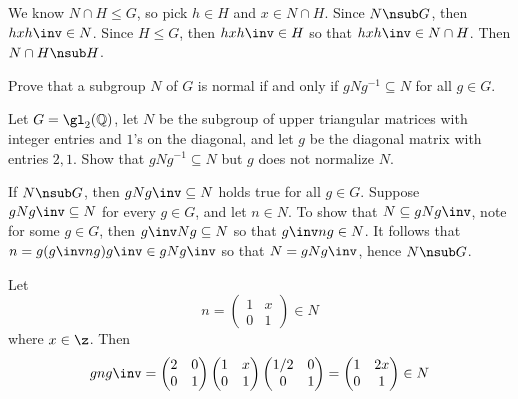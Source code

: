 \begin{problems}
    \begin{sol}
        We know $N \cap H \leq G$, so pick $h \in H$ and $x \in N \cap H$. Since $N \nsub G$, then $hxh\inv \in N$. Since $H \leq G$, then $hxh\inv \in H$ so that $hxh\inv \in N \cap H$. Then $N \cap H \nsub H$.
    \end{sol}
    \item 
    \begin{problems}
        \item Prove that a subgroup $N$ of $G$ is normal if and only if $gNg^{-1} \subseteq N$ for all $g \in G$.
        \item Let $G = \gl_2(\mathbb{Q})$, let $N$ be the subgroup of upper triangular matrices with integer entries and $1$'s on the diagonal, and let $g$ be the diagonal matrix with entries $2,1$. Show that $gNg^{-1} \subseteq N$ but $g$ does not normalize $N$.
    \end{problems}
    \begin{solalph}
        \item \rightimp If $N \nsub G$, then $gNg\inv \subseteq N$ holds true for all $g \in G$.
        \down\noindent
        \leftimp Suppose $gNg\inv \subseteq N$ for every $g \in G$, and let $n \in N$. To show that $N \subseteq gNg\inv$, note for some $g \in G$, then $g\inv Ng \subseteq N$ so that $g\inv ng \in N$. It follows that $n = g(g\inv ng)g\inv \in gNg\inv$ so that $N = gNg\inv$, hence $N \nsub G$.
        \item Let
        \[n = 
        \begin{pmatrix}
            1 & x \\
            0 & 1
        \end{pmatrix} \in N\]
        where $x \in \z$. Then
        \[gng\inv = 
        \begin{pmatrix}
            2 & 0 \\
            0 & 1
        \end{pmatrix}
        \begin{pmatrix}
            1 & x \\
            0 & 1
        \end{pmatrix}
        \begin{pmatrix}
            1/2 & 0 \\
            0 & 1
        \end{pmatrix} = 
        \begin{pmatrix}
            1 & 2x \\
            0 & 1
        \end{pmatrix} \in N\]

\end{solalph}
\end{problems}
